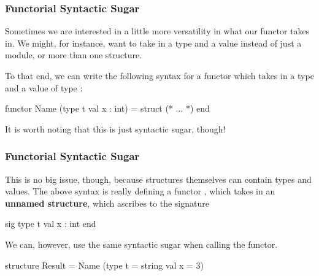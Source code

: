 \documentclass[aspectratio=169, handout]{beamer}
\begin{document}
\begin{frame}[fragile]
  \frametitle{Functorial Syntactic Sugar}

  Sometimes we are interested in a little more versatility in what our functor
  takes in. We might, for instance, want to take in a type and a value instead of
  just a module, or more than one structure.

  \pause
  \vspace{\fill}

  To that end, we can write the following syntax for a functor which takes in
  a type  and a value  of type :

  \begin{codeblock}
    functor Name (type t
                  val x : int) =
      struct
        (* ... *)
      end
  \end{codeblock}

  \pause
  \vspace{\fill}


  \pause
  \vspace{\fill}

  It is worth noting that this is just syntactic sugar, though!
\end{frame}

\begin{frame}[fragile]
  \frametitle{Functorial Syntactic Sugar}


  \pause
  \vspace{\fill}

  This is no big issue, though, because structures themselves can contain types
  and values. The above syntax is really defining a functor , which
  takes in an \textbf{unnamed structure}, which ascribes to the signature

  \begin{codeblock}
    sig
      type t
      val x : int
    end
  \end{codeblock}

  \pause
  \vspace{\fill}

  We can, however, use the same syntactic sugar when calling the functor.

  \vspace{\fill}

  \begin{codeblock}
    structure Result = Name (type t = string
                             val x = 3)
  \end{codeblock}
\end{frame}
\end{document}
